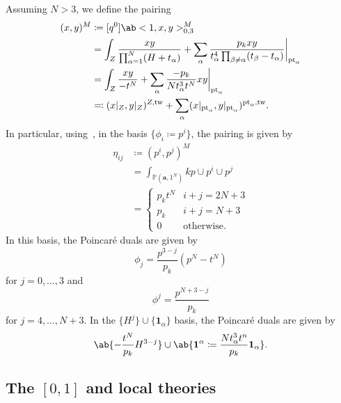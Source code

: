 \documentclass[10pt]{amsart}
\theoremstyle{definition}
\theoremstyle{remark}
\theoremstyle{plain}
\theoremstyle{definition}
\theoremstyle{remark}
\newcommand{\ba}{\mathbf{a}}
\renewcommand{\P}{\mathbb{P}}
\newcommand{\mbf}[1]{\mathbf{#1}}
\newcommand{\mr}[1]{\mathrm{#1}}
\newcommand{\1}{\mathbf{1}}
\newcommand{\2}{\mathbf{2}}
\newcommand{\3}{\mathbf{3}}
\newcommand{\pt}{\mr{pt}}
\newcommand{\tw}{\mr{tw}}
\numberwithin{equation}{section}
\begin{document}
Assuming $N > 3$, we define the pairing
\begin{align*}
    (x,y)^M &\coloneqq [q^0]\ab<1,x,y>_{0,3}^M \\
    &= \int_{Z} \frac{xy}{\prod_{\alpha=1}^N (H+t_{\alpha})} + \sum_{\alpha} \frac{p_k xy}{t_{\alpha}^4 \prod_{\beta \neq \alpha} (t_{\beta} - t_{\alpha})} \bigg\vert_{\pt_{\alpha}} \\
    &= \int_{Z} \frac{xy}{-t^N} + \sum_{\alpha} \frac{-p_k}{N t_{\alpha}^3 t^N} xy \bigg\vert_{\pt_{\alpha}}\\
    &\eqqcolon (x|_{Z},y|_{Z})^{Z, \tw} + \sum_{\alpha} (x|_{\pt_{\alpha}}, y|_{\pt_{\alpha}})^{\pt_{\alpha}, \tw}.
\end{align*}
In particular, using~, in the basis $\{ \phi_i \coloneqq p^i\}$, the pairing is given by
\begin{align*}
    \eta_{ij} &\coloneqq (p^i, p^j)^M \\
    &= \int_{\P(\ba, 1^N)} kp \cup p^i \cup p^j \\
    &= \begin{cases}
        p_k t^N & i+j = 2N+3 \\
        p_k & i+j = N+3 \\
        0 & \text{otherwise}.
    \end{cases}
\end{align*}
In this basis, the Poincar\'e duals are given by
\[ \phi_j = \frac{p^{3-j}}{p_k}(p^N-t^N) \]
for $j=0, \ldots, 3$ and
\[ \phi^j = \frac{p^{N+3-j}}{p_k} \]
for $j=4, \ldots, N+3$. In the $\{H^j\} \cup \{\mbf{1}_{\alpha}\}$ basis, the Poincar\'e duals are given by
\[ \ab\{ -\frac{t^N}{p_k} H^{3-j}\} \cup \ab\{\mbf{1}^{\alpha} \coloneqq \frac{N t_{\alpha}^3 t^n}{p_k} \mbf{1}_{\alpha} \}. \]

\subsection{The $[0,1]$ and local theories}
\label{sub:The 01 and local theories}
\end{document}
